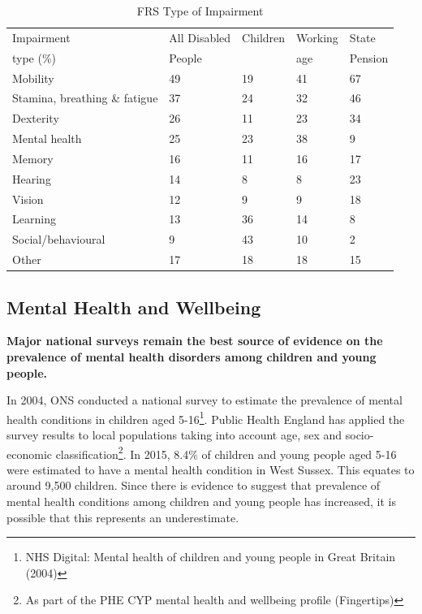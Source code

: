 \begin{table}[hbt]
    \caption{FRS Type of Impairment}
    \centering
    \begin{tabular}{lllll}
    \toprule
    Impairment & All Disabled & Children & Working & State \\
    type (\%) & People & \ & age & Pension \\
    \midrule
    Mobility & 49 & 19 & 41 & 67 \\
    Stamina, breathing \& fatigue & 37 & 24 & 32 & 46 \\
    Dexterity & 26 & 11 & 23 & 34 \\
    Mental health & 25 & 23 & 38 & 9 \\
    Memory & 16 & 11 & 16 & 17 \\
    Hearing & 14 & 8 & 8 & 23 \\
    Vision & 12 & 9 & 9 & 18 \\
    Learning & 13 & 36 & 14 & 8 \\
    Social/behavioural & 9 & 43 & 10 & 2 \\
    Other & 17 & 18 & 18 & 15 \\
    \bottomrule
    \end{tabular}
    \label{tab:impairment}
\end{table}

\subsection{Mental Health and Wellbeing}
{\bfseries Major national surveys remain the best source of evidence on the prevalence of mental health disorders among children and young people.}

In 2004, ONS conducted a national survey to estimate the prevalence of mental health conditions in children aged 5-16\footnote{NHS Digital: Mental health of children and young people in Great Britain (2004)}. Public Health England has applied the survey results to local populations taking into account age, sex and socio-economic classification\footnote{As part of the PHE CYP mental health and wellbeing profile (Fingertips)}. In 2015, 8.4\% of children and young people aged 5-16 were estimated to have a mental health condition in West Sussex. This equates to around 9,500 children. Since there is evidence to suggest that prevalence of mental health conditions among children and young people has increased, it is possible that this represents an underestimate.%

